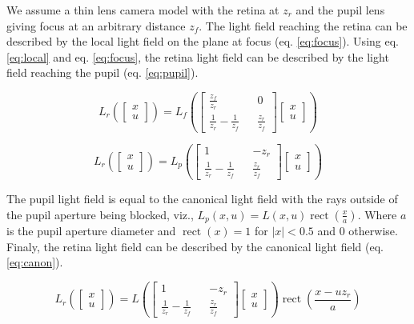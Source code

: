 \documentclass[acmtog,review,anonymous]{acmart}
\DeclareMathOperator{\rect}{rect}
\begin{document}
We assume a thin lens camera model with the retina at $z_{r}$ and the pupil lens giving focus at an arbitrary distance $z_{f}$. The light field reaching the retina can be described by the local light field on the plane at focus (eq. \ref{eq:focus}). Using eq. \ref{eq:local} and eq. \ref{eq:focus}, the retina light field can be described by the light field reaching the pupil (eq. \ref{eq:pupil}).

\begin{equation} \label{eq:focus}
L_{r}\left(\begin{bmatrix}x\\u\end{bmatrix}\right) =
L_{f}\left(\begin{bmatrix}\frac{z_{f}}{z_{r}} && 0\\\frac{1}{z_{r}} - \frac{1}{z_{f}} && \frac{z_{r}}{z_{f}}\end{bmatrix} \begin{bmatrix}x\\u\end{bmatrix}\right)
\end{equation}

\begin{equation} \label{eq:pupil}
L_{r}\left(\begin{bmatrix}x\\u\end{bmatrix}\right) =
L_{p}\left(\begin{bmatrix}1 && -z_{r}\\\frac{1}{z_{r}} - \frac{1}{z_{f}} && \frac{z_{r}}{z_{f}}\end{bmatrix} \begin{bmatrix}x\\u\end{bmatrix}\right)
\end{equation}

The pupil light field is equal to the canonical light field with the rays outside of the pupil aperture being blocked, viz., $L_{p}(x, u) = L(x, u) \rect(\frac{x}{a})$. Where $a$ is the pupil aperture diameter and $\rect(x) = 1$ for $|x| < 0.5$ and $0$ otherwise. Finaly, the retina light field can be described by the canonical light field (eq. \ref{eq:canon}).

\begin{equation} \label{eq:canon}
L_{r}\left(\begin{bmatrix}x\\u\end{bmatrix}\right) =
L\left(\begin{bmatrix}1 && -z_{r}\\\frac{1}{z_{r}} - \frac{1}{z_{f}} && \frac{z_{r}}{z_{f}}\end{bmatrix} \begin{bmatrix}x\\u\end{bmatrix}\right)
\rect\left(\frac{x - u z_{r}}{a}\right)
\end{equation}
\end{document}
